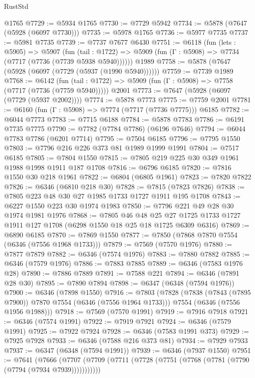\begin{lexlean}{RustStd}
\begin{coremodule}
    @1765
@7729 := @5934 @1765
@7730 := @7729 @5942
@7734 := @5878 (@7647 (@5928 (@6097 @7730)))
@7735 := @5978 @1765
@7736 := @5977 @7735
@7737 := @5981 @7735
@7739 := @7737 @7677 @6430
@7751 := @6118
    (fun (lets : @5905) =>
    @5907
      (fun (tail : @1722) => @5909 (fun (Γ : @5908) => @7734 (@7717 (@7736 (@7739 @5938 @5940))))))
    @1989
@7758 := @5878 (@7647 (@5928 (@6097 (@7729 (@5937 (@1990 @5940))))))
@7759 := @7739 @1989
@7768 := @6142
    (fun (tail : @1722) => @5909 (fun (Γ : @5908) => @7758 (@7717 (@7736 (@7759 @5940)))))
    @2001
@7773 := @7647 (@5928 (@6097 (@7729 (@5937 @2002))))
@7774 := @5878 @7773
@7775 := @7759 @2001
@7781 := @6160 (fun (Γ : @5908) => @7774 (@7717 (@7736 @7775))) @6185
@7782 := @6044 @7773
@7783 := @7715 @6188
@7784 := @5878 @7783
@7786 := @6191 @7735 @7775
@7790 := @7782 (@7784 @7786) (@6196 @7646)
@7794 := @6044 @7783 @7786 (@6201 @7714)
@7795 := @7504 @6185
@7796 := @7795 @1550
@7803 := @7796 @216 @226 @373 @81 @1989 @1999 @1991
@7804 := @7517 @6185
@7805 := @7804 @1550
@7815 := @7805 @219 @225 @30 @349 @1961 @1988 @1998 @1911 @187 @1708
@7816 := @6796 @6185
@7820 := @7816 @1550 @30 @218 @1961
@7822 := @6804 (@6805 @1961)
@7823 := @7820 @7822
@7826 := @6346 (@6810 @218 @30)
@7828 := @7815 (@7823 @7826)
@7838 := @7805 @223 @48 @30 @27 @1985 @1733 @1727 @1911 @195 @1708
@7843 := @6227 @1550 @223 @30 @1974 @1983
@7850 := @7796 @221 @49 @28 @30 @1974 @1981 @1976
@7868 := @7805
    @46
    @48
    @25
    @27
    @1725
    @1733
    @1727
    @1911
    @127
    @1708
    (@6298 @1550 @18 @25 @18 @1725 @6309 @6316)
@7869 := @6890 @6185
@7870 := @7869 @1550
@7877 := @7850 (@7868 @7870 @7554 (@6346 (@7556 @1968 @1733)))
@7879 := @7569 (@7570 @1976)
@7880 := @7877 @7879
@7882 := @6346 (@7574 @1976)
@7883 := @7880 @7882
@7885 := @6346 (@7579 @1976)
@7886 := @7883 @7885
@7889 := @6346 (@7583 @1976 @28)
@7890 := @7886 @7889
@7891 := @7588 @221
@7894 := @6346 (@7891 @28 @30)
@7895 := @7890 @7894
@7898 := @6347 (@6348 (@7594 @1976))
@7900 := @6346 (@7898 @1550)
@7916 := @7803
    (@7828
      (@7838 (@7843 (@7895 @7900)) @7870 @7554 (@6346 (@7556 @1964 @1733)))
      @7554
      (@6346 (@7556 @1956 @1988)))
@7918 := @7569 (@7570 @1991)
@7919 := @7916 @7918
@7921 := @6346 (@7574 @1991)
@7922 := @7919 @7921
@7924 := @6346 (@7579 @1991)
@7925 := @7922 @7924
@7928 := @6346 (@7583 @1991 @373)
@7929 := @7925 @7928
@7933 := @6346 (@7588 @216 @373 @81)
@7934 := @7929 @7933
@7937 := @6347 (@6348 (@7594 @1991))
@7939 := @6346 (@7937 @1550)
@7951 := @7641
    (@7666 (@7707 (@7709 (@7711 (@7728 (@7751 (@7768 (@7781 (@7790 (@7794 (@7934 @7939)))))))))))

\end{coremodule}
\end{lexlean}
